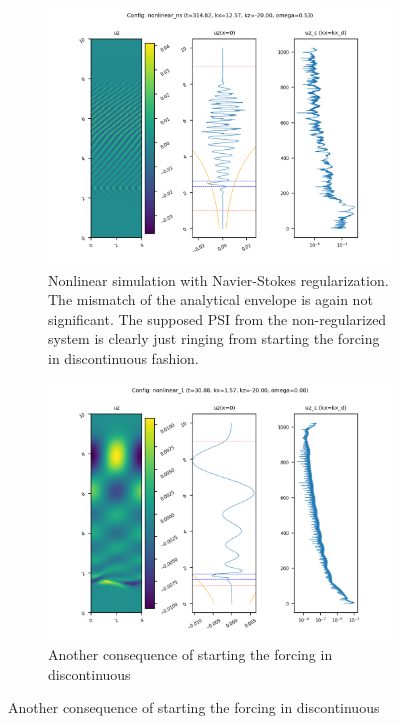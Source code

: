 \documentclass[11pt,
        usenames, %
        dvipsnames %
    ]{article}
\begin{document}
\begin{figure}[t]
    \begin{subfigure}{0.47\textwidth}
        \centering
        \includegraphics[width=\textwidth]{figs/nonlin_ns.png}
        \caption{Nonlinear simulation with Navier-Stokes regularization. The
        mismatch of the analytical envelope is again not significant. The
        supposed PSI from the non-regularized system is clearly just ringing
        from starting the forcing in discontinuous fashion.}
    \end{subfigure}\hfill
    \begin{subfigure}{0.47\textwidth}
        \centering
        \includegraphics[width=\textwidth]{figs/nonlin_driving_blowup.png}
        \caption{Another consequence of starting the forcing in discontinuous
}
\end{subfigure}
\end{figure}
\end{document}
